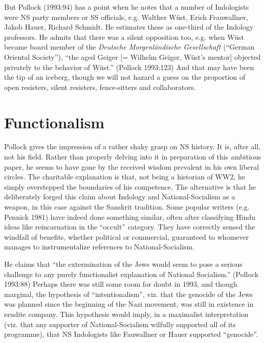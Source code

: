 But Pollock (1993:94) has a point when he notes that a number of Indologists were NS party members or SS officials, e.g. Walther Wüst, Erich Frauwallner, Jakob Hauer, Richard Schmidt. He estimates these as one-third of the Indology professors. He admits that there was a silent opposition too, e.g. when Wüst became board member of the {\sl Deutsche Morgenländische Gesellschaft} (“German Oriental Society”), “the aged Geiger [= Wilhelm Geiger, Wüst’s mentor] objected privately to the behavior of Wüst.” (Pollock 1993:123) And that may have been the tip of an iceberg, though we will not hazard a guess on the proportion of open resisters, silent resisters, fence-sitters and collaborators.

\section*{Functionalism}

Pollock gives the impression of a rather shaky grasp on NS history. It is, after all, not his field. Rather than properly delving into it in preparation of this ambitious paper, he seems to have gone by the received wisdom prevalent in his own liberal circles. The charitable explanation is that, not being a historian of WW2, he simply overstepped the boundaries of his competence. The alternative is that he deliberately forged this claim about Indology and National-Socialism as a weapon, in this case against the Sanskrit tradition. Some popular writers (e.g. Pennick 1981) have indeed done something similar, often after classifying Hindu ideas like reincarnation in the “occult” category. They have correctly sensed the windfall of benefits, whether political or commercial, guaranteed to whomever manages to instrumentalize references to National-Socialism.

He claims that “the extermination of the Jews would seem to pose a serious challenge to any purely functionalist explanation of National Socialism.” (Pollock 1993:88) Perhaps there was still some room for doubt in 1993, and though marginal, the hypothesis of “intentionalism”, viz. that the genocide of the Jews was planned since the beginning of the Nazi movement, was still in existence in erudite company. This hypothesis would imply, in a maximalist interpretation (viz. that any supporter of National-Socialism wilfully supported all of its programme), that NS Indologists like Fauwallner or Hauer supported “genocide”.

